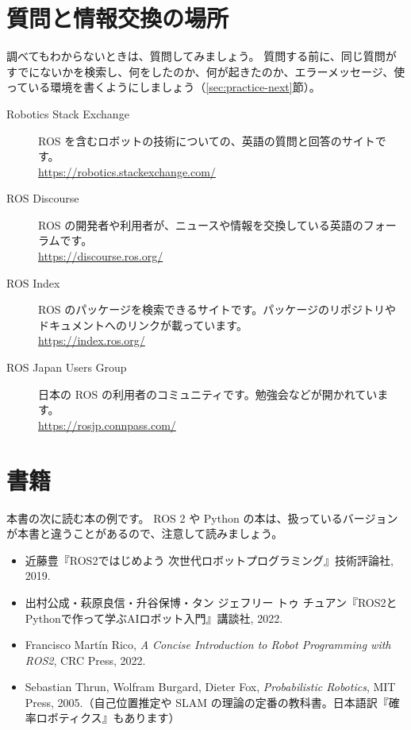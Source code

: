 \section{質問と情報交換の場所}
\label{sec:references-community}

調べてもわからないときは、質問してみましょう。
質問する前に、同じ質問がすでにないかを検索し、何をしたのか、何が起きたのか、エラーメッセージ、使っている環境を書くようにしましょう（\ref{sec:practice-next}節）。

\begin{description}
  \item[Robotics Stack Exchange] ROS を含むロボットの技術についての、英語の質問と回答のサイトです。\\\url{https://robotics.stackexchange.com/}
  \item[ROS Discourse] ROS の開発者や利用者が、ニュースや情報を交換している英語のフォーラムです。\\\url{https://discourse.ros.org/}
  \item[ROS Index] ROS のパッケージを検索できるサイトです。パッケージのリポジトリやドキュメントへのリンクが載っています。\\\url{https://index.ros.org/}
  \item[ROS Japan Users Group] 日本の ROS の利用者のコミュニティです。勉強会などが開かれています。\\\url{https://rosjp.connpass.com/}
\end{description}

\section{書籍}
\label{sec:references-books}

本書の次に読む本の例です。
ROS 2 や Python の本は、扱っているバージョンが本書と違うことがあるので、注意して読みましょう。

\begin{itemize}
  \item 近藤豊『ROS2ではじめよう 次世代ロボットプログラミング』技術評論社, 2019.
  \item 出村公成・萩原良信・升谷保博・タン ジェフリー トゥ チュアン『ROS2とPythonで作って学ぶAIロボット入門』講談社, 2022.
  \item Francisco Martín Rico, \textit{A Concise Introduction to Robot Programming with ROS2}, CRC Press, 2022.
  \item Sebastian Thrun, Wolfram Burgard, Dieter Fox, \textit{Probabilistic Robotics}, MIT Press, 2005.（自己位置推定や SLAM の理論の定番の教科書。日本語訳『確率ロボティクス』もあります）
\end{itemize}
